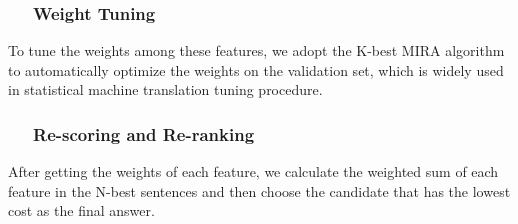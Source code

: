 \documentclass[11pt,a4paper]{article}
\begin{document}
\subsubsection*{~~ Weight Tuning}
To tune the weights among these features, we adopt the K-best MIRA algorithm \cite{cherry-foster:2012:NAACL-HLT} to automatically optimize the weights on the validation set, which is widely used in statistical machine translation tuning procedure.

\subsubsection*{~~ Re-scoring and Re-ranking}
After getting the weights of each feature, we calculate the weighted sum of each feature in the N-best sentences and then choose the candidate that has the lowest cost as the final answer.
\end{document}
